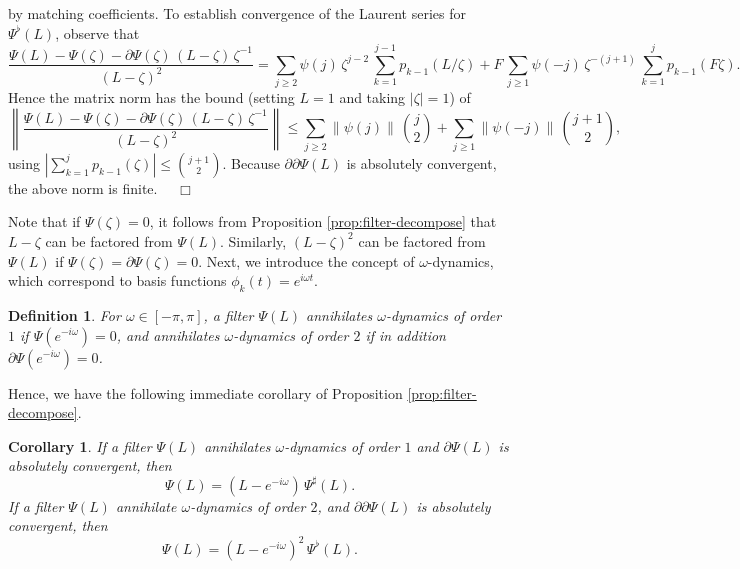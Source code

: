 \documentclass[a4paper]{book}
\newtheorem{Corollary}{Corollary}
\newtheorem{Definition}{Definition}
\begin{document}
 by matching coefficients.  To establish convergence of the 
 Laurent series for $\Psi^{\flat} (L)$,  observe that
\[
 \frac{  \Psi (L) - \Psi (\zeta)  - \partial \Psi (\zeta) 
 \, (L- \zeta) \, \zeta^{-1}  }{ {(L- \zeta)}^2 } =
    \sum_{j \geq 2} \psi (j) \, \zeta^{j-2} \, \sum_{k=1}^{j-1} p_{k-1} (L/\zeta) +
     F \, \sum_{j \geq 1} \psi(-j) \, \zeta^{-(j+1)} \, \sum_{k=1}^{j} p_{k-1} (F \zeta).
\]
 Hence the matrix norm has   the bound (setting $L=1$ and taking $|\zeta| = 1$) of
\[
 \left\|   \frac{  \Psi (L) - \Psi (\zeta) 
 - \partial \Psi (\zeta) \, (L- \zeta) \, \zeta^{-1}  }{ {(L- \zeta)}^2 }  \right\|
  \leq  \sum_{j \geq 2} \| \psi (j)  \|  \, \binom{j}{2} + 
  \sum_{j \geq 1} \| \psi(-j)  \|  \, \binom{j+1}{2},
\]
 using $| \sum_{k=1}^j p_{k-1} (\zeta) | \leq \binom{j+1}{2}$.  
 Because $\partial \partial \Psi (L)$ is 
 absolutely convergent, the above norm is finite.  $\quad \Box$

\vspace{.5cm}

 Note that if $\Psi (\zeta) = 0$, it follows from 
  Proposition \ref{prop:filter-decompose} that $L-\zeta$ can be factored from
  $\Psi (L)$.  Similarly, ${(L- \zeta)}^2$ can be factored 
   from $\Psi (L)$ if $\Psi(\zeta) = \partial \Psi (\zeta) =0$.
  Next, we introduce the concept of $\omega$-dynamics, which correspond
  to basis functions $\phi_k (t) = e^{i \omega t}$.

\begin{Definition} \rm
\label{def:filter-noise}
 For $\omega \in [-\pi, \pi]$, a filter $\Psi (L)$ annihilates 
 $\omega$-dynamics of order $1$ if $\Psi (e^{-i \omega}) = 0$,
 and annihilates $\omega$-dynamics of order $2$ if in addition 
 $\partial \Psi (e^{-i \omega}) = 0$.
\end{Definition}


Hence, we have the following immediate corollary of 
Proposition \ref{prop:filter-decompose}.

\begin{Corollary}
 \label{cor:filter-noise}
  If a filter $\Psi (L)$ annihilates $\omega$-dynamics of order $1$ 
  and $\partial \Psi (L)$ is absolutely convergent, then
\[
  \Psi (L) = (L- e^{-i \omega}) \, \Psi^{\sharp} (L).
\]
 If a filter $\Psi (L)$ annihilate $\omega$-dynamics of order $2$,  
 and $\partial \partial \Psi (L)$ is absolutely convergent, then
\[
  \Psi (L) = {(L- e^{-i \omega}) }^2 \, \Psi^{\flat} (L).
\]
\end{Corollary}
\end{document}
